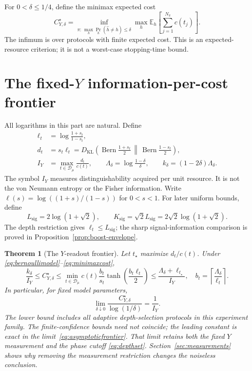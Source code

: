 \documentclass[11pt,a4paper]{article}
\newcommand{\E}{\mathbb E}
\newtheorem{theorem}{Theorem}[section]
\theoremstyle{definition}
\theoremstyle{remark}
\numberwithin{equation}{section}
\begin{document}
For $0<\delta\leq1/4$, define the minimax expected cost
\begin{equation}\label{eq:minimaxcost}
 C_{Y,\delta}^\star=
 \inf_{\pi:\,\max_h\Pr_h(\widehat h\ne h)\leq\delta}
 \max_h\E_h\left[\sum_{j=1}^{N_\pi}c(t_j)\right].
\end{equation}
The infimum is over protocols with finite expected cost. This is an
expected-resource criterion; it is not a worst-case stopping-time bound.

\section{The fixed-\texorpdfstring{$Y$}{Y} information-per-cost frontier}\label{sec:frontier}
All logarithms in this part are natural. Define
\begin{align}
 \ell_t&=\log\frac{1+s_t}{1-s_t},\\
 d_t&=s_t\ell_t
 =D_{\mathrm{KL}}\!\left(
 \operatorname{Bern}\tfrac{1+s_t}{2}\,\middle\|\,
 \operatorname{Bern}\tfrac{1-s_t}{2}\right),\\
 I_Y&=\max_{t\in\mathcal D_\mu}\frac{d_t}{c(t)},\qquad
 \Lambda_\delta=\log\frac{1-\delta}{\delta},\qquad
 k_\delta=(1-2\delta)\Lambda_\delta .
\end{align}
The symbol $I_Y$ measures distinguishability acquired per unit
resource. It is not the von Neumann entropy or the Fisher information.
Write $\ell(s)=\log((1+s)/(1-s))$ for $0<s<1$. For later uniform bounds, define
\begin{equation}\label{eq:signalconstants}
 L_{\mathrm{sig}}=2\log(1+\sqrt2),\qquad
 K_{\mathrm{sig}}=\sqrt2 L_{\mathrm{sig}}
 =2\sqrt2\log(1+\sqrt2).
\end{equation}
The depth restriction gives $\ell_t\leq L_{\mathrm{sig}}$; the sharp
signal-information comparison is proved in Proposition~\ref{prop:boost-envelope}.

\begin{theorem}[The $Y$-readout frontier]\label{thm:frontier}
Let $t_\star$ maximize $d_t/c(t)$. Under
\eqref{eq:bernoullimodel}--\eqref{eq:minimaxcost},
\begin{equation}\label{eq:mainfrontier}
 \frac{k_\delta}{I_Y}\leq C_{Y,\delta}^\star
 \leq\min_{t\in\mathcal D_\mu}
 c(t)\frac{b_t}{s_t}\tanh\!\left(\frac{b_t\ell_t}{2}\right)
 \leq\frac{\Lambda_\delta+\ell_{t_\star}}{I_Y},
 \quad
 b_t=\left\lceil\frac{\Lambda_\delta}{\ell_t}\right\rceil .
\end{equation}
In particular, for fixed model parameters,
\begin{equation}\label{eq:asymptoticfrontier}
 \lim_{\delta\downarrow 0}\frac{C_{Y,\delta}^\star}{\log(1/\delta)}
 =\frac1{I_Y}.
\end{equation}
The lower bound includes all adaptive depth-selection protocols in this
experiment family. The finite-confidence bounds need not coincide; the
leading constant is exact in the limit~\eqref{eq:asymptoticfrontier}.
That limit retains both the fixed $Y$ measurement and the phase cutoff
\eqref{eq:depthset}. Section~\ref{sec:measurements} shows why removing
the measurement restriction changes the noiseless conclusion.
\end{theorem}
\end{document}
